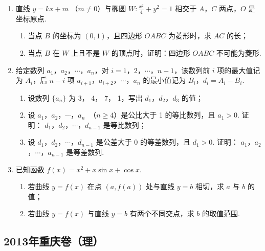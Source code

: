 \begin{description}
\begin{enumerate}[leftmargin=5pt]
        \item 直线 \( y = kx + m  \) （\(m \neq 0\)）与椭圆 \( W: \frac{x^2}{4} + y^2 = 1 \) 相交于 \(A\)，\(C\) 两点，\(O\) 是坐标原点.
\begin{enumerate}
\item 当点 \(B\) 的坐标为 \((0,1)\)，且四边形 \(OABC\) 为菱形时，求 \(AC\) 的长；
\item 当点 \(B\) 在 \(W\) 上且不是 \(W\) 的顶点时，证明：四边形 \(OABC\) 不可能为菱形.
\end{enumerate}

        \item 给定数列 \(a_1\)，\(a_2\)，\(\cdots\)，\(a_n\)，对 \(i = 1\)，\(2\)，\(\cdots\)，\(n-1\)，该数列前 \(i\) 项的最大值记为 \(A_i\)，后 \(n-i\) 项 \(a_{i+1}\)，\(a_{i+2}\)，\(\cdots\)，\(a_n\) 的最小值记为 \(B_i\)，\(d_i = A_i - B_i\).
\begin{enumerate}
\item 设数列 \(\{a_n\}\) 为 3， 4， 7， 1，写出 \(d_1\)，\(d_2\)，\(d_3\) 的值；
\item 设 \(a_1\)，\(a_2\)，\(\cdots\)，\(a_n\ \) （\(n \geqslant 4\)）是公比大于 1 的等比数列，且 \(a_1 > 0\). 证明： \(d_1\)，\(d_2\)，\(\cdots\)，\(d_{n-1}\) 是等比数列；
\item 设 \(d_1\)，\(d_2\)，\(\cdots\)，\(d_{n-1}\) 是公差大于 0 的等差数列，且 \(d_1 > 0\). 证明： \(a_1\)，\(a_2\)，\(\cdots\)，\(a_{n-1}\) 是等差数列.
\end{enumerate}

        \item 已知函数 \( f(x) = x^2 + x \sin x + \cos x \).
\begin{enumerate}
\item 若曲线 \( y = f(x) \) 在点 \((a, f(a))\) 处与直线 \( y = b \) 相切，求 \( a \) 与 \( b \) 的值；
\item 若曲线 \( y = f(x) \) 与直线 \( y = b \) 有两个不同交点，求 \( b \) 的取值范围.
\end{enumerate}

    \end{enumerate}

\end{description}


\subsection{2013年重庆卷（理）}\label{gk:2013年重庆卷（理）}

